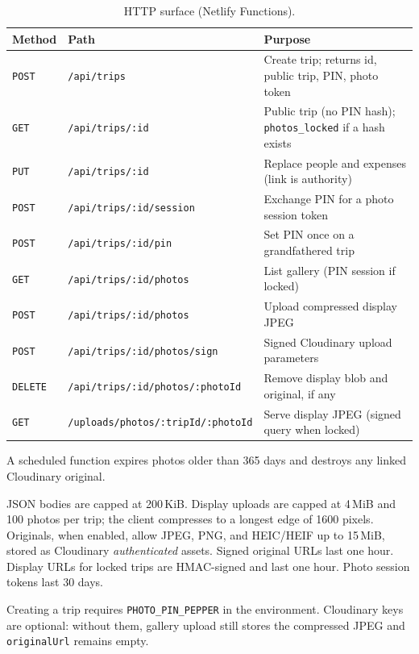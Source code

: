 \documentclass[11pt,a4paper]{article}
\newcommand{\code}[1]{\texttt{#1}}
\begin{document}
\begin{table}[ht]
\centering
\caption{HTTP surface (Netlify Functions).}
\label{tab:api}
\begin{tabular}{@{}llp{6.6cm}@{}}
\toprule
Method & Path & Purpose \\
\midrule
\code{POST} & \code{/api/trips} & Create trip; returns id, public trip, PIN, photo token \\
\code{GET}  & \code{/api/trips/:id} & Public trip (no PIN hash); \code{photos\_locked} if a hash exists \\
\code{PUT}  & \code{/api/trips/:id} & Replace people and expenses (link is authority) \\
\code{POST} & \code{/api/trips/:id/session} & Exchange PIN for a photo session token \\
\code{POST} & \code{/api/trips/:id/pin} & Set PIN once on a grandfathered trip \\
\code{GET}  & \code{/api/trips/:id/photos} & List gallery (PIN session if locked) \\
\code{POST} & \code{/api/trips/:id/photos} & Upload compressed display JPEG \\
\code{POST} & \code{/api/trips/:id/photos/sign} & Signed Cloudinary upload parameters \\
\code{DELETE} & \code{/api/trips/:id/photos/:photoId} & Remove display blob and original, if any \\
\code{GET}  & \code{/uploads/photos/:tripId/:photoId} & Serve display JPEG (signed query when locked) \\
\bottomrule
\end{tabular}
\end{table}

A scheduled function expires photos older than 365 days and destroys any linked Cloudinary original.

JSON bodies are capped at 200\,KiB.
Display uploads are capped at 4\,MiB and 100 photos per trip; the client compresses to a longest edge of 1600 pixels.
Originals, when enabled, allow JPEG, PNG, and HEIC/HEIF up to 15\,MiB, stored as Cloudinary \emph{authenticated} assets.
Signed original URLs last one hour.
Display URLs for locked trips are HMAC-signed and last one hour.
Photo session tokens last 30 days.

Creating a trip requires \code{PHOTO\_PIN\_PEPPER} in the environment.
Cloudinary keys are optional: without them, gallery upload still stores the compressed JPEG and \code{originalUrl} remains empty.
\end{document}
